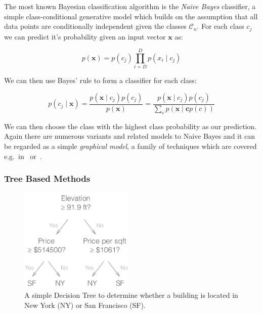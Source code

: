 The most known Bayesian classification algorithm is the \emph{Naive Bayes} classifier, a simple class-conditional generative model which builds on the assumption that all data points are conditionally independent given the classes $\mathcal{C}_n$. For each class $c_j$ we can predict it's probability given an input vector $\mathbf{x}$ as:

\begin{equation}
  p(\mathbf{x}) = p(c_j) \prod_{i=D}^D p(x_i \mid c_j)
\end{equation}

We can then use Bayes' rule to form a classifier for each class:

\begin{equation}
  p(c_j \mid \mathbf{x}) = \frac{p(\mathbf{x} \mid c_j ) p(c_j)}{ p (\mathbf{x})} = \frac{p(\mathbf{x} \mid c_j ) p(c_j)}{ \sum_c p(\mathbf{x \mid c} p(c)) }
\end{equation}

We can then choose the class with the highest class probability as our prediction. Again there are numerous variants and related models to Naive Bayes and it can be regarded as a simple \emph{graphical model}, a family of techniques which are covered e.g.\ in~\cite{Barber:2012aa} or~\cite{Bishop:2006aa}.


\subsubsection{Tree Based Methods}
\label{subs:Tree Based Methods}

\begin{figure}
  \centering
  \includegraphics[width=0.48\textwidth]{img/decision-tree.pdf}
  \caption{A simple Decision Tree to determine whether a building is located in New York (NY) or San Francisco (SF).}
\label{fig:decision-tree}
\end{figure}

